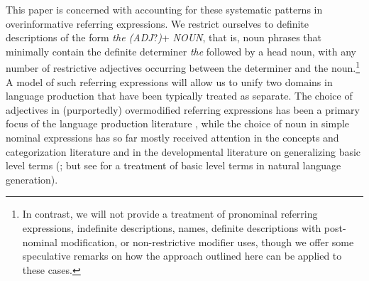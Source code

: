\documentclass[11pt]{article}
\newcommand{\cg}[1]{\textcolor{Purple}{[cg: #1]}}
\begin{document}
This paper is concerned with accounting for these systematic patterns in overinformative referring expressions. We restrict ourselves to definite descriptions of the form \emph{the (ADJ}?\emph{)}+ \emph{NOUN}, that is, noun phrases that minimally contain the definite determiner \emph{the} followed by a head noun, with any number of restrictive adjectives occurring between the determiner and the noun.\footnote{In contrast, we will not provide a treatment of pronominal referring expressions, indefinite descriptions, names, definite descriptions with post-nominal modification, or non-restrictive modifier uses, though we offer some speculative remarks on how the approach outlined here can be applied to these cases.} 
A model of such referring expressions will allow us to unify two domains in language production that have been typically treated as separate. %
The choice of adjectives in (purportedly) overmodified referring expressions has been a primary focus of the language production literature
\cite{herrmann1976, Pechmann1989, nadig2002, sedivy2003a, Maes2004, Engelhardt2006, Arts2011, Koolen2011, rubiofernandez2016}, while the choice of noun in simple nominal expressions has so far mostly received attention in the concepts and categorization literature \cite{Rosch1973, Rosch1976} and in the developmental literature on generalizing basic level terms (; but see  for a treatment of basic level terms in natural language generation). %
\end{document}
